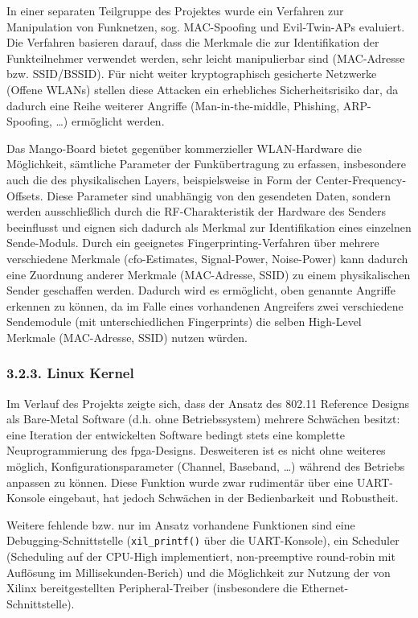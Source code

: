 \documentclass[ngerman,]{scrartcl}
\begin{document}
In einer separaten Teilgruppe des Projektes wurde ein Verfahren zur
Manipulation von Funknetzen, sog. MAC-Spoofing und Evil-Twin-APs
evaluiert. Die Verfahren basieren darauf, dass die Merkmale die zur
Identifikation der Funkteilnehmer verwendet werden, sehr leicht
manipulierbar sind (MAC-Adresse bzw. SSID/BSSID). Für nicht weiter
kryptographisch gesicherte Netzwerke (Offene WLANs) stellen diese
Attacken ein erhebliches Sicherheitsrisiko dar, da dadurch eine Reihe
weiterer Angriffe (Man-in-the-middle, Phishing, ARP-Spoofing, \ldots{})
ermöglicht werden.

Das Mango-Board bietet gegenüber kommerzieller WLAN-Hardware die
Möglichkeit, sämtliche Parameter der Funkübertragung zu erfassen,
insbesondere auch die des physikalischen Layers, beispielsweise in Form
der Center-Frequency-Offsets. Diese Parameter sind unabhängig von den
gesendeten Daten, sondern werden ausschließlich durch die
RF-Charakteristik der Hardware des Senders beeinflusst und eignen sich
dadurch als Merkmal zur Identifikation eines einzelnen Sende-Moduls.
Durch ein geeignetes Fingerprinting-Verfahren über mehrere verschiedene
Merkmale (\ac{cfo}-Estimates, Signal-Power, Noise-Power) kann dadurch
eine Zuordnung anderer Merkmale (MAC-Adresse, SSID) zu einem
physikalischen Sender geschaffen werden. Dadurch wird es ermöglicht,
oben genannte Angriffe erkennen zu können, da im Falle eines vorhandenen
Angreifers zwei verschiedene Sendemodule (mit unterschiedlichen
Fingerprints) die selben High-Level Merkmale (MAC-Adresse, SSID) nutzen
würden.\autocite{rftap-mac}

\subsubsection{3.2.3. Linux Kernel}\label{linux-kernel}

Im Verlauf des Projekts zeigte sich, dass der Ansatz des 802.11
Reference Designs als Bare-Metal Software (d.h. ohne Betriebssystem)
mehrere Schwächen besitzt: eine Iteration der entwickelten Software
bedingt stets eine komplette Neuprogrammierung des \ac{fpga}-Designs.
Desweiteren ist es nicht ohne weiteres möglich, Konfigurationsparameter
(Channel, Baseband, \ldots{}) während des Betriebs anpassen zu können.
Diese Funktion wurde zwar rudimentär über eine UART-Konsole eingebaut,
hat jedoch Schwächen in der Bedienbarkeit und Robustheit.

Weitere fehlende bzw. nur im Ansatz vorhandene Funktionen sind eine
Debugging-Schnittstelle (\texttt{xil\_printf()} über die UART-Konsole),
ein Scheduler (Scheduling auf der CPU-High implementiert, non-preemptive
round-robin mit Auflösung im Millisekunden-Berich) und die Möglichkeit
zur Nutzung der von Xilinx bereitgestellten Peripheral-Treiber
(insbesondere die Ethernet-Schnittstelle).
\end{document}
